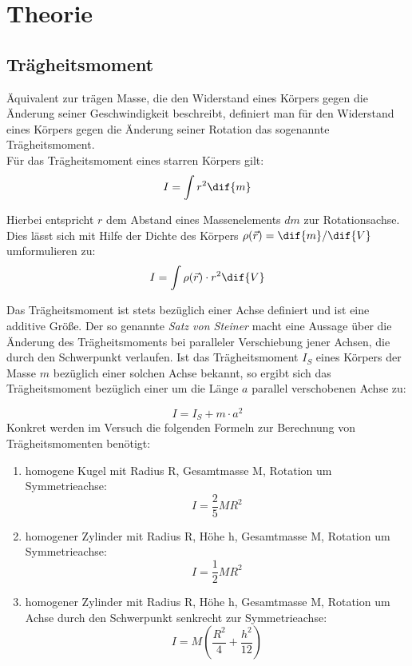 \section{Theorie}

\subsection{Trägheitsmoment}
Äquivalent zur trägen Masse, die den Widerstand eines Körpers gegen die Änderung seiner Geschwindigkeit beschreibt,
definiert man für den Widerstand eines Körpers gegen die Änderung seiner Rotation das sogenannte Trägheitsmoment. \\
Für das Trägheitsmoment eines starren Körpers gilt:
\begin{equation}
   I = \int r^2 \dif{m}
\end{equation}

Hierbei entspricht $r$ dem Abstand eines Massenelements $dm$ zur Rotationsachse. Dies
lässt sich mit Hilfe der Dichte des Körpers $\rho(\vec{r}) = \dif{m}/\dif{V}$ umformulieren zu:
\begin{equation}
  I = \int \rho(\vec{r})\cdot r^2 \dif{V}
\end{equation}

Das Trägheitsmoment ist stets bezüglich einer Achse definiert und ist eine
additive Größe. Der so genannte \textit{Satz von Steiner} macht eine Aussage über die Änderung des Trägheitsmoments
bei paralleler Verschiebung jener Achsen, die durch den Schwerpunkt verlaufen. Ist das
Trägheitsmoment $I_S$ eines Körpers der Masse $m$ bezüglich einer solchen Achse bekannt, so ergibt sich das
Trägheitsmoment bezüglich einer um die Länge $a$ parallel verschobenen Achse zu:

\begin{equation}
    I = I_S + m \cdot a^2
    \label{eq: steiner}
\end{equation}
Konkret werden im Versuch die folgenden Formeln zur Berechnung von Trägheitsmomenten benötigt:
\begin{enumerate}
  \item homogene Kugel mit Radius R, Gesamtmasse M, Rotation um Symmetrieachse:
  \begin{equation}
  \label{eq:traeg_kugel}
    I = \frac{2}{5}M R^2
  \end{equation}

  \item homogener Zylinder mit Radius R, Höhe h, Gesamtmasse M, Rotation um Symmetrieachse:
  \begin{equation}
  \label{eq:traeg_zylinde}
    I = \frac{1}{2} M R^2
  \end{equation}

  \item homogener Zylinder mit Radius R, Höhe h, Gesamtmasse M, Rotation um Achse durch den Schwerpunkt senkrecht zur Symmetrieachse:
  \begin{equation}
  \label{eq:traeg_zylinder_schwer}
    I = M (\frac{R^2}{4} + \frac{h^2}{12})
  \end{equation}
\end{enumerate}

